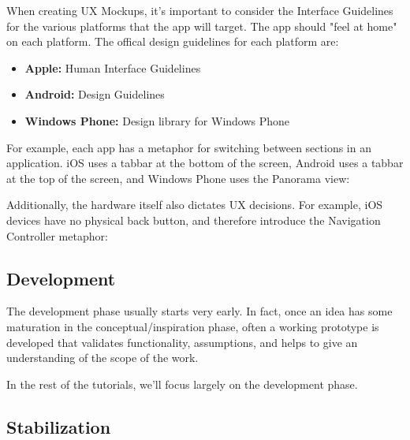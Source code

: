 When creating UX Mockups, it’s important to consider the Interface Guidelines for the various platforms that the app will target. The app should "feel at home" on each platform. The offical design guidelines for each platform are:

\begin{itemize}


 \item \textbf{Apple:} Human Interface Guidelines

 \item \textbf{Android:}  Design Guidelines

 \item \textbf{Windows Phone:}  Design library for Windows Phone


\end{itemize}
For example, each app has a metaphor for switching between sections in an application. iOS uses a tabbar at the bottom of the screen, Android uses a tabbar at the top of the screen, and Windows Phone uses the Panorama view:

Additionally, the hardware itself also dictates UX decisions. For example, iOS devices have no physical back button, and therefore introduce the Navigation Controller metaphor:


\subsection{Development}
The development phase usually starts very early. In fact, once an idea has some maturation in the conceptual/inspiration phase, often a working prototype is developed that validates functionality, assumptions, and helps to give an understanding of the scope of the work.

In the rest of the tutorials, we’ll focus largely on the development phase.


\subsection{Stabilization}

